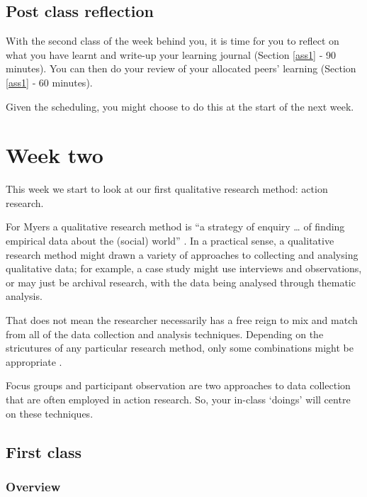 \documentclass[]{book}
\theoremstyle{definition}
\theoremstyle{definition}
\theoremstyle{definition}
\theoremstyle{remark}
\begin{document}
\hypertarget{post-class-reflection-1}{%
\section*{Post class reflection}\label{post-class-reflection-1}}

With the second class of the week behind you, it is time for you to
reflect on what you have learnt and write-up your learning journal
(Section \ref{ass1} ‐ 90 minutes). You can then do your review of your
allocated peers' learning (Section \ref{ass1} ‐ 60 minutes).

Given the scheduling, you might choose to do this at the start of the
next week.

\hypertarget{w2-details}{%
\chapter{Week two}\label{w2-details}}

This week we start to look at our first qualitative research method:
action research.

For Myers a qualitative research method is ``a strategy of enquiry
\ldots{} of finding empirical data about the (social) world''
\autocite*[ p.~4]{myers_2013_qualitativeresearchbusiness}. In a
practical sense, a qualitative research method might drawn a variety of
approaches to collecting and analysing qualitative data; for example, a
case study might use interviews and observations, or may just be
archival research, with the data being analysed through thematic
analysis.

That does not mean the researcher necessarily has a free reign to mix
and match from all of the data collection and analysis techniques.
Depending on the stricutures of any particular research method, only
some combinations might be appropriate
\autocite{gehman_2017_findingtheorymethod}.

Focus groups and participant observation are two approaches to data
collection that are often employed in action research. So, your in-class
`doings' will centre on these techniques.

\hypertarget{first-class-1}{%
\section*{First class}\label{first-class-1}}

\hypertarget{overview-2}{%
\subsection*{Overview}\label{overview-2}}
\end{document}
